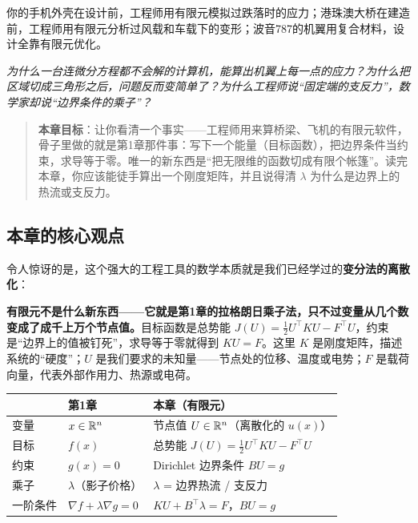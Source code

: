 \begin{example}[你身边的有限元]
你的手机外壳在设计前，工程师用有限元模拟过跌落时的应力；港珠澳大桥在建造前，工程师用有限元分析过风载和车载下的变形；波音787的机翼用复合材料，设计全靠有限元优化。
\end{example}

\vspace{0.5cm}
\noindent\textit{为什么一台连微分方程都不会解的计算机，能算出机翼上每一点的应力？为什么把区域切成三角形之后，问题反而变简单了？为什么工程师说“固定端的支反力”，数学家却说“边界条件的乘子”？}

\begin{quote}
\textbf{本章目标}：让你看清一个事实——工程师用来算桥梁、飞机的有限元软件，骨子里做的就是第1章那件事：写下一个能量（目标函数），把边界条件当约束，求导等于零。唯一的新东西是“把无限维的函数切成有限个帐篷”。读完本章，你应该能徒手算出一个刚度矩阵，并且说得清 $\lambda$ 为什么是边界上的热流或支反力。
\end{quote}

\subsection*{本章的核心观点}

令人惊讶的是，这个强大的工程工具的数学本质就是我们已经学过的\textbf{变分法的离散化}：

\begin{tcolorbox}[colback=yellow!10, colframe=orange!80, title=核心观点]
\textbf{有限元不是什么新东西——它就是第1章的拉格朗日乘子法，只不过变量从几个数变成了成千上万个节点值。}目标函数是总势能 $J(U) = \frac{1}{2}U^\top KU - F^\top U$，约束是“边界上的值被钉死”，求导等于零就得到 $KU = F$。这里 $K$ 是刚度矩阵，描述系统的“硬度”；$U$ 是我们要求的未知量——节点处的位移、温度或电势；$F$ 是载荷向量，代表外部作用力、热源或电荷。

\begin{center}
\renewcommand{\arraystretch}{1.3}
\small
\begin{tabular}{lll}
\toprule
 & \textbf{第1章} & \textbf{本章（有限元）} \\
\midrule
变量 & $x \in \mathbb{R}^n$ & 节点值 $U \in \mathbb{R}^n$（离散化的 $u(x)$） \\
目标 & $f(x)$ & 总势能 $J(U) = \frac{1}{2}U^\top KU - F^\top U$ \\
约束 & $g(x) = 0$ & Dirichlet 边界条件 $BU = g$ \\
乘子 & $\lambda$（影子价格） & $\lambda$ = 边界热流 / 支反力 \\
一阶条件 & $\nabla f + \lambda \nabla g = 0$ & $KU + B^\top \lambda = F$，$BU = g$ \\
\bottomrule
\end{tabular}
\end{center}
\end{tcolorbox}

